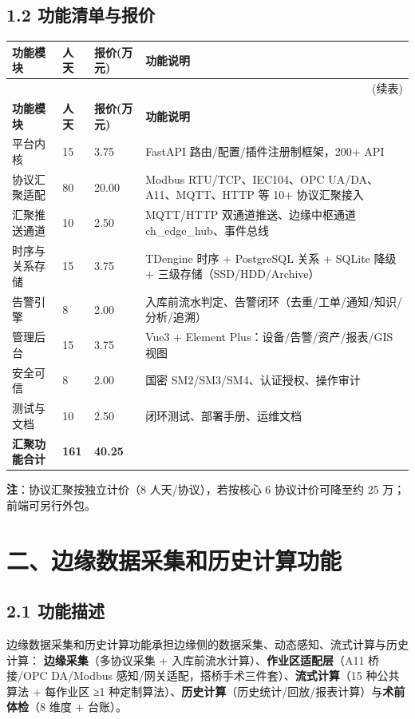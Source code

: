 \documentclass[11pt,a4paper]{ctexart}
\begin{document}
\subsection{1.2 功能清单与报价}

\begin{longtable}{p{4.2cm} p{2.2cm} p{2.2cm} p{4.8cm}}
\toprule
\textbf{功能模块} & \textbf{人天} & \textbf{报价(万元)} & \textbf{功能说明} \\
\midrule
\endfirsthead
\midrule
\multicolumn{4}{r}{(续表)} \\
\toprule
\textbf{功能模块} & \textbf{人天} & \textbf{报价(万元)} & \textbf{功能说明} \\
\midrule
\endhead
平台内核 & 15 & 3.75 & FastAPI 路由/配置/插件注册制框架，200+ API \\
协议汇聚适配 & 80 & 20.00 & Modbus RTU/TCP、IEC104、OPC UA/DA、A11、MQTT、HTTP 等 10+ 协议汇聚接入 \\
汇聚推送通道 & 10 & 2.50 & MQTT/HTTP 双通道推送、边缘中枢通道 ch\_edge\_hub、事件总线 \\
时序与关系存储 & 15 & 3.75 & TDengine 时序 + PostgreSQL 关系 + SQLite 降级 + 三级存储（SSD/HDD/Archive） \\
告警引擎 & 8 & 2.00 & 入库前流水判定、告警闭环（去重/工单/通知/知识/分析/追溯） \\
管理后台 & 15 & 3.75 & Vue3 + Element Plus：设备/告警/资产/报表/GIS 视图 \\
安全可信 & 8 & 2.00 & 国密 SM2/SM3/SM4、认证授权、操作审计 \\
测试与文档 & 10 & 2.50 & 闭环测试、部署手册、运维文档 \\
\midrule
\textbf{汇聚功能合计} & \textbf{161} & \textbf{40.25} & \\
\bottomrule
\end{longtable}

\textbf{注}：协议汇聚按独立计价（8 人天/协议），若按核心 6 协议计价可降至约 25 万；前端可另行外包。

\section{二、边缘数据采集和历史计算功能}

\subsection{2.1 功能描述}

边缘数据采集和历史计算功能承担边缘侧的数据采集、动态感知、流式计算与历史计算：
\textbf{边缘采集}（多协议采集 + 入库前流水计算）、\textbf{作业区适配层}（A11 桥接/OPC DA/Modbus 感知/网关适配，搭桥手术三件套）、\textbf{流式计算}（15 种公共算法 + 每作业区 ≥1 种定制算法）、\textbf{历史计算}（历史统计/回放/报表计算）与\textbf{术前体检}（8 维度 + 台账）。
\end{document}
